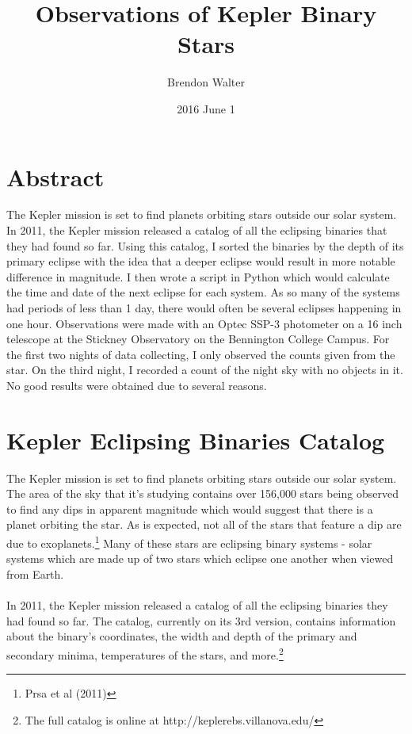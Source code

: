 \documentclass[12pt]{article}
\title{Observations of Kepler Binary Stars}
\date{2016 June 1}
\author{Brendon Walter}
\begin{document}
	\maketitle
	
	\section{Abstract}
	
	The Kepler mission is set to find planets orbiting stars outside our solar system. In 2011, the Kepler mission released a catalog of all the eclipsing binaries that they had found so far. Using this catalog, I sorted the binaries by the depth of its primary eclipse with the idea that a deeper eclipse would result in more notable difference in magnitude. I then wrote a script in Python which would calculate the time and date of the next eclipse for each system. As so many of the systems had periods of less than 1 day, there would often be several eclipses happening in one hour. Observations were made with an Optec SSP-3 photometer on a 16 inch telescope at the Stickney Observatory on the Bennington College Campus. For the first two nights of data collecting, I only observed the counts given from the star. On the third night, I recorded a count of the night sky with no objects in it. No good results were obtained due to several reasons.
	
	\section{Kepler Eclipsing Binaries Catalog}
	
	The Kepler mission is set to find planets orbiting stars outside our solar system. The area of the sky that it's studying contains over 156,000 stars being observed to find any dips in apparent magnitude which would suggest that there is a planet orbiting the star. As is expected, not all of the stars that feature a dip are due to exoplanets.\footnote{Prsa et al (2011)} Many of these stars are eclipsing binary systems - solar systems which are made up of two stars which eclipse one another when viewed from Earth.
	\\\\
	In 2011, the Kepler mission released a catalog of all the eclipsing binaries they had found so far. The catalog, currently on its 3rd version, contains information about the binary's coordinates, the width and depth of the primary and secondary minima, temperatures of the stars, and more.\footnote{The full catalog is online at http://keplerebs.villanova.edu/}
	
\end{document}
